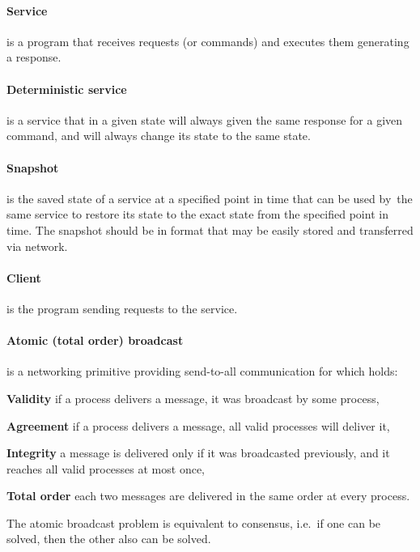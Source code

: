\paragraph{Service}
is a program that receives requests (or commands) and executes them generating a response.

\paragraph{Deterministic service}
is a service that in a given state will always given the same response for a given command, and will always change its state to the same state.

\paragraph{Snapshot}
is the saved state of a service at a specified point in time that can be used by~the same service to restore its state to the exact state from the specified point in time. The snapshot should be in format that may be easily stored and transferred via network.

\paragraph{Client}
is the program sending requests to the service.

\paragraph{Atomic (total order) broadcast}
is a networking primitive providing send-to-all communication for which holds:
\begin{tightList}[\setlength{\leftmargin}{2\leftmargin}]
 \item[\textbf{Validity}] if a process delivers a message, it was broadcast by some process,
 \item[\textbf{Agreement}] if a process delivers a message, all valid processes will deliver it,
 \item[\textbf{Integrity}] a message is delivered only if it was broadcasted previously, and it reaches all valid processes at most once,
 \item[\textbf{Total order}] each two messages are delivered in the same order at every process.
\end{tightList}

\noindent The atomic broadcast problem is equivalent to consensus, i.e.\ if one can be solved, then the other also can be solved.

